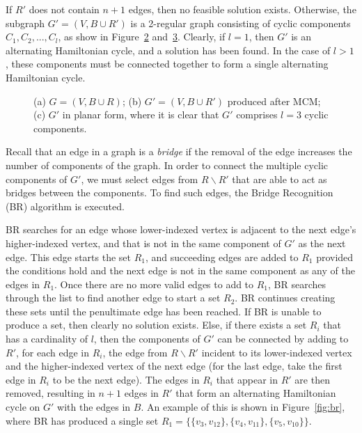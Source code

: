 \documentclass{elsarticle}
\begin{document}
If $R'$ does not contain $n+1$ edges, then no feasible solution exists. Otherwise, the subgraph $G'=(V, B \cup R')$ is a 2-regular graph consisting of cyclic components $C_1,C_2,...,C_l$, as show in Figure~\ref{fig:matching} and~\ref{fig:mps}. Clearly, if $l = 1$, then $G'$ is an alternating Hamiltonian cycle, and a solution has been found. In the case of $l > 1$, these components must be connected together to form a single alternating Hamiltonian cycle.

\begin{figure}[H]	
	\centering
	\begin{subfigure}[h]{0.3\textwidth}
		
		\caption{}
		\label{fig:threshold}
	\end{subfigure} \hspace{5mm}
	\begin{subfigure}[h]{0.3\textwidth}
		
		\caption{}
		\label{fig:matching}
	\end{subfigure} \hspace{5mm}
	\begin{subfigure}[h]{0.25\textwidth}
		
		\caption{}
		\label{fig:mps}
	\end{subfigure}
	\caption{(a) $G = (V, B\cup R)$; (b) $G'=(V, B \cup R')$ produced after MCM; (c) $G'$ in planar form, where it is clear that $G'$ comprises $l = 3$ cyclic components.}
	\label{fig:mcm}
\end{figure}

Recall that an edge in a graph is a \emph{bridge} if the removal of the edge increases the number of components of the graph. In order to connect the multiple cyclic components of $G'$, we must select edges from $R \backslash R'$ that are able to act as bridges between the components. To find such edges, the Bridge Recognition (BR) algorithm is executed.

BR searches for an edge whose lower-indexed vertex is adjacent to the next edge's higher-indexed vertex, and that is not in the same component of $G'$ as the next edge. This edge starts the set $R_1$, and succeeding edges are added to $R_1$ provided the conditions hold and the next edge is not in the same component as any of the edges in $R_1$. Once there are no more valid edges to add to $R_1$, BR searches through the list to find another edge to start a set $R_2$. BR continues creating these sets until the penultimate edge has been reached. If BR is unable to produce a set, then clearly no solution exists. Else, if there exists a set $R_i$ that has a cardinality of $l$, then the components of $G'$ can be connected by adding to $R'$, for each edge in $R_i$, the edge from $R \backslash R'$ incident to its lower-indexed vertex and the higher-indexed vertex of the next edge (for the last edge, take the first edge in $R_i$ to be the next edge). The edges in $R_i$ that appear in $R'$ are then removed, resulting in $n+1$ edges in $R'$ that form an alternating Hamiltonian cycle on $G'$ with the edges in $B$. An example of this is shown in Figure~\ref{fig:br}, where BR has produced a single set $R_1 = \{\{v_3, v_{12}\},\{v_4, v_{11}\}, \{v_5, v_{10}\}\}$.
\end{document}

